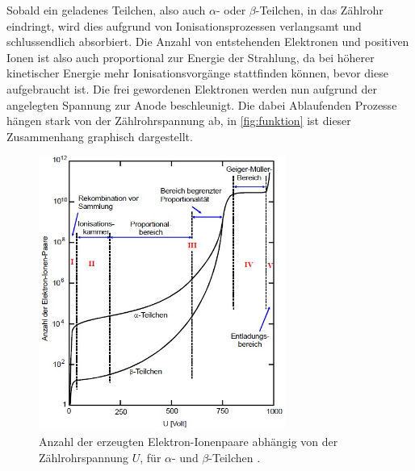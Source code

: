 Sobald ein geladenes Teilchen, also auch $\alpha$- oder $\beta$-Teilchen, in das Zählrohr eindringt, wird dies
aufgrund von Ionisationsprozessen verlangsamt und schlussendlich absorbiert.
Die Anzahl von entstehenden Elektronen und positiven Ionen ist also auch proportional zur Energie der Strahlung,
da bei höherer kinetischer Energie mehr Ionisationsvorgänge stattfinden können, bevor diese aufgebraucht ist.
Die frei gewordenen Elektronen werden nun aufgrund der angelegten Spannung zur Anode beschleunigt.
Die dabei Ablaufenden Prozesse hängen stark von der Zählrohrspannung ab, in \autoref{fig:funktion} ist dieser
Zusammenhang graphisch dargestellt.

\begin{figure}[H]
    \centering
    \includegraphics[height=9cm]{content/pics/funktion.jpg}
    \caption{Anzahl der erzeugten Elektron-Ionenpaare abhängig von der Zählrohrspannung $U$,
    für $\alpha$- und $\beta$-Teilchen \cite{v703}.}
    \label{fig:funktion}
\end{figure}

